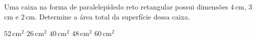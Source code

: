 Uma caixa na forma de paralelepídedo reto retangular possui dimensões $4$\,cm, $3$\,cm e $2$\,cm. Determine a área total da superfície dessa caixa.

$52$\,cm$^2$
$26$\,cm$^2$
$40$\,cm$^2$
$48$\,cm$^2$
$60$\,cm$^2$



